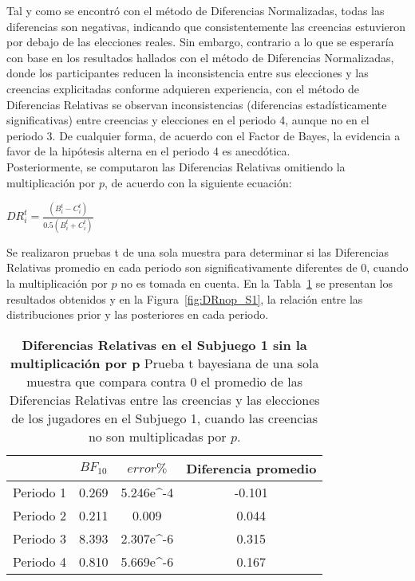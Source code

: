 Tal y como se encontró con el método de Diferencias Normalizadas, todas las diferencias son negativas, indicando que consistentemente las creencias estuvieron por debajo de las elecciones reales. Sin embargo, contrario a lo que se esperaría con base en los resultados hallados con el método de Diferencias Normalizadas, donde los participantes reducen la inconsistencia entre sus elecciones y las creencias explicitadas conforme adquieren experiencia, con el método de Diferencias Relativas se observan inconsistencias (diferencias estadísticamente significativas) entre creencias y elecciones en el periodo 4, aunque no en el periodo 3. De cualquier forma, de acuerdo con el Factor de Bayes, la evidencia a favor de la hipótesis alterna en el periodo 4 es anecdótica.\\

Posteriormente, se computaron las Diferencias Relativas omitiendo la multiplicación por $p$, de acuerdo con la siguiente ecuación:

\begin{center}
$DR_i^t=  \frac{(B_i^t- C_i^t)}{0.5(B_i^t+ C_i^t)}$
\end{center}

Se realizaron pruebas t de una sola muestra para determinar si las Diferencias Relativas promedio en cada periodo son significativamente diferentes de 0, cuando la multiplicación por $p$ no es tomada en cuenta. En la Tabla~\ref{DRnop-S1-B} se presentan los resultados obtenidos y en la Figura~\ref{fig:DRnop_S1}, la relación entre las distribuciones prior y las posteriores en cada periodo.\\


\begin{table}[h]
\caption[Diferencias Relativas en el Subjuego 1, omitiendo la multiplicación por $p$ (prueba t de una muestra)]{\textbf{Diferencias Relativas en el Subjuego 1 sin la multiplicación por p} Prueba t bayesiana de una sola muestra que compara contra 0 el promedio de las Diferencias Relativas entre las creencias y las elecciones de los jugadores en el Subjuego 1, cuando las creencias no son multiplicadas por $p$.}
\label{DRnop-S1-B}
\centering
\begin{tabular}{l | c c | c}
\toprule
\textbf{} & \textbf{$BF_{10}$} & \textbf{$error\%$} & \textbf{Diferencia promedio}\\
\midrule
Periodo 1 & 0.269 & 5.246e^-4 & -0.101\\
Periodo 2 & 0.211 & 0.009 & 0.044\\
Periodo 3 & 8.393 & 2.307e^-6 & 0.315\\
Periodo 4 & 0.810 & 5.669e^-6 & 0.167\\
\bottomrule
\end{tabular}
\end{table}
	

